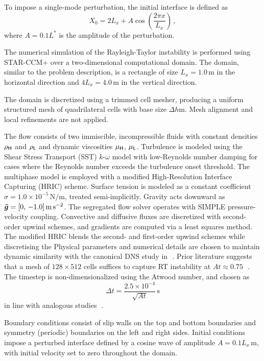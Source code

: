 To impose a single-mode perturbation, the initial interface is defined as
\[
X_0 = 2 L_x + A \cos\left(\frac{2 \pi x}{L_x}\right) \,,
\]
where \(A = 0.1L^{*}\) is the amplitude of the perturbation.

The numerical simulation of the Rayleigh-Taylor instability is performed using STAR-CCM+ 
over a two-dimensional computational domain. The domain, similar to the problem description,  
is a rectangle of size \(L_x = 1.0\,\si{\meter}\) in the horizontal direction 
and \(4 L_x = 4.0\,\si{\meter}\) in the vertical direction.

The domain is discretized using a trimmed cell mesher, producing a uniform 
structured mesh of quadrilateral cells with base size \(\Delta h \si{\meter}\). 
Mesh alignment and local refinements are not applied.

The flow consists of two immiscible, incompressible fluids with constant 
densities \(\rho_{\mathsf {H}}\) and \(\rho_{\mathsf {L}}\) and dynamic 
viscosities \(\mu_{\mathsf {H}}\), \(\mu_{\mathsf {L}}\). Turbulence is modeled using the Shear Stress 
Transport (SST) \(k\)-\(\omega\) model with low-Reynolds number damping for cases where the 
Reynolds number exceeds the turbulence onset threshold.
The multiphase model is employed with a modified High-Resolution 
Interface Capturing (HRIC) scheme. Surface tension is modeled as a constant 
coefficient \(\sigma = 1.0 \times 10^{-5}\,\si{\newton\per\meter}\), treated 
semi-implicitly. Gravity acts downward as \(\bm{\bar{g}} = [0,\, -1.0]\,\si{\meter\per\second\squared}\).
The segregated flow solver operates with SIMPLE pressure-velocity coupling. 
Convective and diffusive fluxes are discretized with second-order upwind schemes, and gradients 
are computed via a least squares method. The modified HRIC blends the second- and first-order upwind
schemes while discretising the 
Physical parameters and numerical details are chosen to maintain dynamic 
similarity with the canonical DNS study in~\cite{hamzehlooDirectNumericalSimulations2021}\,. 
Prior literature suggests that a mesh of \(128 \times 512\) cells suffices to capture 
RT instability at \(At \approx 0.75\)~\cite{MIRJALILI2019221}\,. The timestep is 
non-dimensionalized using the Atwood number, and chosen as 
\[
\Delta t = \frac{2.5 \times 10^{-4}}{\sqrt{At}} \, \si{\second}
\]
in line with analogous studies~\cite{DingDiffuseInterfaceModel2007,hamzehlooDirectNumericalSimulations2021}\,.


Boundary conditions consist of slip walls on the top and bottom boundaries and symmetry 
(periodic) boundaries on the left and right sides.
Initial conditions impose a perturbed interface defined by a cosine wave of 
amplitude \(A = 0.1 L_x\,\si{\meter}\), with initial velocity set to zero throughout the domain.

